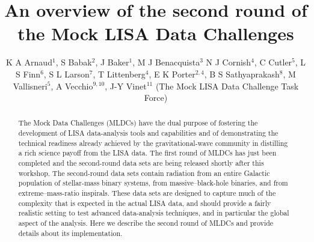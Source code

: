 \documentclass{iopart}
\begin{document}
\title[The second round of Mock LISA Data Challenges]{An overview of the second round of the Mock LISA Data Challenges}

\author{K A Arnaud$^1$,
S Babak$^2$,
J Baker$^1$,
M J Benacquista$^3$
N J Cornish$^4$,
C Cutler$^5$,
L S Finn$^6$,
S L Larson$^7$,
T Littenberg$^4$,
E K Porter$^{2,4}$,
B S Sathyaprakash$^8$,
M Vallisneri$^5$,
A Vecchio$^{9,10}$,
J-Y Vinet$^{11}$ (The Mock LISA Data Challenge Task Force)}

\address{$^1$ Gravitational Astrophysics Laboratory, NASA Goddard Space Flight Center, 8800 Greenbelt Road, Greenbelt, MD 20771, US}
\address{$^2$ Max-Planck-Institut f\"{u}r Gravitationsphysik (Albert-Einstein-Institut), Am M\"{u}hlenberg 1, D-14476 Golm bei Potsdam, Germany}
\address{$^3$ Center for Gravitational Wave Astronomy, University of Texas at Brownsville, Brownsville, TX 78520, US}
\address{$^4$ Dept.\ of Phys., Montana State University, Bozeman, MT 59717, US}
\address{$^{5}$ Jet Propulsion Laboratory, California Institute of Technology, Pasadena, CA 91109, US}
\address{$^{6}$ Center for Gravitational Wave Physics, The Pennsylvania State University, University Park, PA 16802, US}
\address{$^{7}$ Dept.\ of Phys., Weber State University, 2508 University of Circle, Ogden, UT 84408, US}
\address{$^{8}$ Dept.\ of Phys.\ and Astron., Cardiff University, 5, The Parade, Cardiff, CF24 3YB, UK}
\address{$^{9}$ School of Phys.\ and Astron., University of Birmingham, Edgbaston, Birmingham B152TT, UK}
\address{$^{10}$ Dept.\ of Phys.\ and Astron., Northwestern University, Evanston, IL 60208, US}
\address{$^{11}$ D\'epartement ARTEMIS, Observatoire de la C\^{o}te d'Azur, BP 429, 06304 Nice, France}
\begin{abstract}
The Mock Data Challenges (MLDCs) have the dual purpose of fostering the development of LISA data-analysis tools and capabilities and of demonstrating the technical readiness already achieved by the gravitational-wave community in distilling a rich science payoff from the LISA data. The first round of MLDCs has just been completed and the second-round data sets are being released shortly after this workshop. The second-round data sets contain radiation from an entire Galactic population of stellar-mass binary systems, from massive--black-hole binaries, and from extreme--mass-ratio inspirals. These data sets are designed to capture much of the complexity that is expected in the actual LISA data, and should provide a fairly realistic setting to test advanced data-analysis techniques, and in particular the global aspect of the analysis. Here we describe the second round of MLDCs and provide details about its implementation.
\end{abstract}
\end{document}
